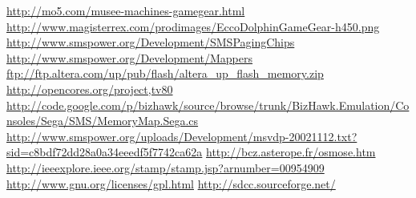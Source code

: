 \documentclass{article}
\begin{document}
\newpage
\begin{thebibliography}{9}
     \url{http://mo5.com/musee-machines-gamegear.html}
     \url{http://www.magisterrex.com/prodimages/EccoDolphinGameGear-h450.png}
     \url{http://www.smspower.org/Development/SMSPagingChips}
     \url{http://www.smspower.org/Development/Mappers}
     \url{ftp://ftp.altera.com/up/pub/flash/altera_up_flash_memory.zip}
     \url{http://opencores.org/project,tv80}
     \url{http://code.google.com/p/bizhawk/source/browse/trunk/BizHawk.Emulation/Consoles/Sega/SMS/MemoryMap.Sega.cs}
     \url{http://www.smspower.org/uploads/Development/msvdp-20021112.txt?sid=c8bdf72dd28a0a34eeedf5f7742ca62a}
     \url{http://bcz.asterope.fr/osmose.htm}
     \url{http://ieeexplore.ieee.org/stamp/stamp.jsp?arnumber=00954909}
     \url{http://www.gnu.org/licenses/gpl.html}
     \url{http://sdcc.sourceforge.net/}
\end{thebibliography}
\end{document}
